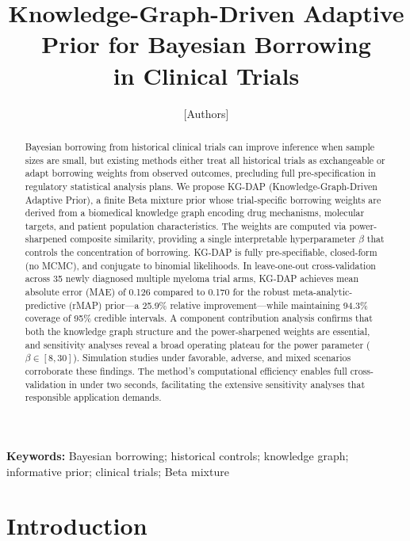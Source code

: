 \documentclass[12pt]{article}
\title{Knowledge-Graph-Driven Adaptive Prior for Bayesian Borrowing\\in Clinical Trials}
\author{[Authors]}
\date{}
\begin{document}
\maketitle

\begin{abstract}
Bayesian borrowing from historical clinical trials can improve inference when sample sizes are small, but existing methods either treat all historical trials as exchangeable or adapt borrowing weights from observed outcomes, precluding full pre-specification in regulatory statistical analysis plans. We propose KG-DAP (Knowledge-Graph-Driven Adaptive Prior), a finite Beta mixture prior whose trial-specific borrowing weights are derived from a biomedical knowledge graph encoding drug mechanisms, molecular targets, and patient population characteristics. The weights are computed via power-sharpened composite similarity, providing a single interpretable hyperparameter $\beta$ that controls the concentration of borrowing. KG-DAP is fully pre-specifiable, closed-form (no MCMC), and conjugate to binomial likelihoods. In leave-one-out cross-validation across 35 newly diagnosed multiple myeloma trial arms, KG-DAP achieves mean absolute error (MAE) of 0.126 compared to 0.170 for the robust meta-analytic-predictive (rMAP) prior---a 25.9\% relative improvement---while maintaining 94.3\% coverage of 95\% credible intervals. A component contribution analysis confirms that both the knowledge graph structure and the power-sharpened weights are essential, and sensitivity analyses reveal a broad operating plateau for the power parameter ($\beta \in [8, 30]$). Simulation studies under favorable, adverse, and mixed scenarios corroborate these findings. The method's computational efficiency enables full cross-validation in under two seconds, facilitating the extensive sensitivity analyses that responsible application demands.
\end{abstract}

\noindent\textbf{Keywords:} Bayesian borrowing; historical controls; knowledge graph; informative prior; clinical trials; Beta mixture

\section{Introduction}
\label{sec:intro}
\end{document}
